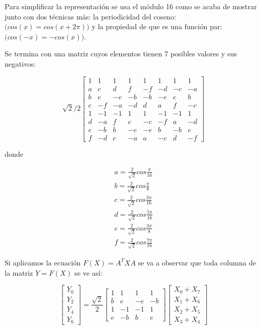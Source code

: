 {Para simplificar la representación se usa el módulo 16 como se acaba de mostrar junto con dos técnicas más: la periodicidad del coseno: $\Big( cos(x) = cos(x + 2\pi) \Big)$ y la propiedad de que es una función par: $\Big( cos(-x) = -cos(x) \Big)$.

Se termina con una matriz cuyos elementos tienen 7 posibles valores y sus negativos:

\begin{equation}
    \label{eq:dct-matrix-simple}
    \sqrt{2}/2
    \begin{bmatrix}
        1 & 1 & 1 & 1 & 1 & 1 & 1 & 1  \\
        a & c & d & f & -f & -d & -c & -a \\
        b & e & -e & -b & -b & -e & e & b \\
        c & -f & -a & -d & d & a & f & -c \\
        1 & -1 & -1 & 1 & 1 & -1 & -1 & 1\\
        d & -a & f & c & -c & -f & a & -d \\
        e & -b & b & -e & -e & b & -b & e \\
        f & -d & c & -a & a & -c & d & -f
    \end{bmatrix}
\end{equation}

donde

\begin{eqnarray*}
    a = \frac{2}{\sqrt{2}}cos\frac{\pi}{16}\\
    b = \frac{2}{\sqrt{2}}cos\frac{\pi}{8}\\
    c = \frac{2}{\sqrt{2}}cos\frac{3\pi}{16}\\
    d = \frac{2}{\sqrt{2}}cos\frac{5\pi}{16}\\
    e = \frac{2}{\sqrt{2}}cos\frac{3\pi}{8}\\
    f = \frac{2}{\sqrt{2}}cos\frac{7\pi}{16}
\end{eqnarray*}

Si aplicamos la ecuación $F(X) = A^{T}XA$ se va a observar que toda columna de la matriz $Y = F(X)$ se ve así:

\begin{equation}
    \label{eq:dct-row}
    \begin{bmatrix}
        Y_0 \\
        Y_2 \\
        Y_4 \\
        Y_6
    \end{bmatrix}
    = \frac{\sqrt{2}}{2} \begin{bmatrix}
        1 & 1 & 1 & 1  \\
        b & e & -e & -b \\
        1 & -1 & -1 & 1  \\
        e & -b & b & e
        \end {bmatrix} \begin {bmatrix}
        X_0 + X_7 \\
        X_1 + X_6 \\
        X_2 + X_5 \\
        X_3 + X_4
        \end {bmatrix}
\end{equation}

}
